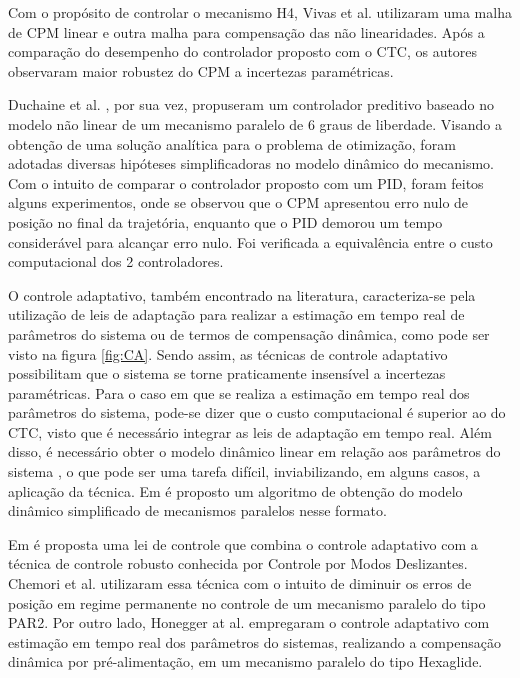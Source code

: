 \documentclass[]{politex}
\begin{document}
Com o propósito de controlar o mecanismo H4, Vivas et al. \cite{Vivas} utilizaram  uma malha de CPM linear e outra malha para compensação das não linearidades. Após a comparação do desempenho do controlador proposto com  o CTC, os autores observaram maior robustez do CPM a incertezas paramétricas. 

Duchaine et al. \cite{Duchaine}, por sua vez, propuseram um controlador preditivo baseado no modelo não linear de um mecanismo paralelo de 6 graus de liberdade. Visando a obtenção de uma solução analítica para o problema de otimização, foram adotadas diversas hipóteses simplificadoras no modelo dinâmico do mecanismo. Com o intuito de comparar o controlador proposto com um PID, foram feitos alguns experimentos, onde se observou  que o CPM apresentou erro nulo de posição no final da trajetória, enquanto que o PID demorou um tempo considerável para alcançar erro nulo. Foi verificada a equivalência entre o custo computacional dos 2 controladores. 

O controle adaptativo, também encontrado na literatura, caracteriza-se pela utilização de leis de adaptação para realizar a estimação em tempo real de parâmetros do sistema ou de termos de compensação dinâmica, como pode ser visto na figura \ref{fig:CA}. Sendo assim, as técnicas de controle adaptativo possibilitam que o sistema se torne praticamente insensível a incertezas paramétricas. Para o caso em que se realiza a estimação em tempo real dos parâmetros do sistema, pode-se dizer que o custo computacional é superior ao do CTC, visto que é necessário integrar as leis de adaptação em tempo real. Além disso, é necessário obter o modelo dinâmico linear em relação aos parâmetros do sistema \cite{SlotiniA}, o que pode ser uma tarefa difícil, inviabilizando, em alguns casos, a aplicação da técnica. Em \cite{CodoureyBurdet} é proposto um algoritmo de obtenção do modelo dinâmico simplificado de mecanismos paralelos nesse formato.

Em \cite{SlotiniA} é proposta uma lei de controle que combina o controle adaptativo com a técnica de controle robusto conhecida por Controle por Modos Deslizantes. Chemori et al. \cite{Chemori} utilizaram essa técnica  com o intuito de diminuir os erros de posição em regime permanente no controle de um mecanismo paralelo do tipo PAR2. Por outro lado, Honegger at al. \cite{Honegger} empregaram o controle adaptativo com estimação em tempo real dos parâmetros do sistemas, realizando a compensação dinâmica por pré-alimentação, em um mecanismo  paralelo do tipo Hexaglide.
\end{document}
